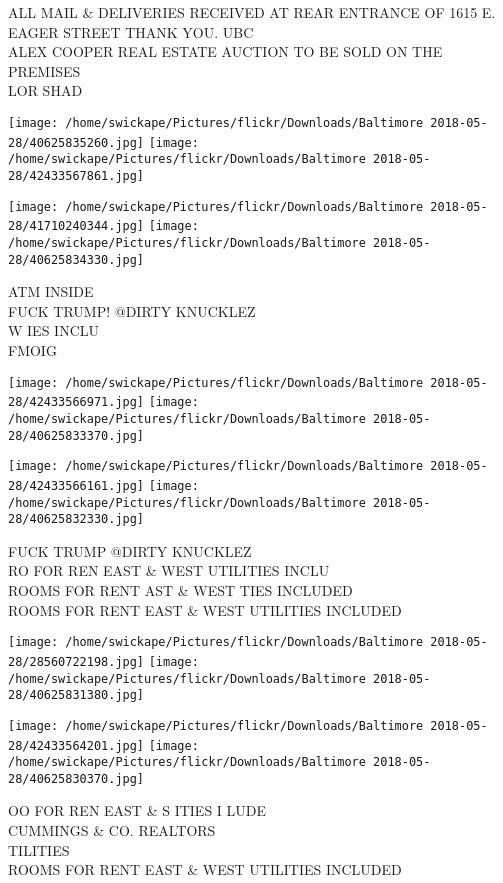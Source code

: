 \documentclass[10pt,letterpaper]{article}
\begin{document}
ALL MAIL \& DELIVERIES RECEIVED AT REAR ENTRANCE OF 1615 E. EAGER STREET THANK YOU. UBC\\
ALEX COOPER REAL ESTATE AUCTION TO BE SOLD ON THE PREMISES\\
LOR SHAD\\
\pagebreak

\texttt{[image: /home/swickape/Pictures/flickr/Downloads/Baltimore 2018-05-28/40625835260.jpg]}
\texttt{[image: /home/swickape/Pictures/flickr/Downloads/Baltimore 2018-05-28/42433567861.jpg]}

\texttt{[image: /home/swickape/Pictures/flickr/Downloads/Baltimore 2018-05-28/41710240344.jpg]}
\texttt{[image: /home/swickape/Pictures/flickr/Downloads/Baltimore 2018-05-28/40625834330.jpg]}

ATM INSIDE\\
FUCK TRUMP!  @DIRTY KNUCKLEZ\\
W IES INCLU\\
FMOIG\\
\pagebreak

\texttt{[image: /home/swickape/Pictures/flickr/Downloads/Baltimore 2018-05-28/42433566971.jpg]}
\texttt{[image: /home/swickape/Pictures/flickr/Downloads/Baltimore 2018-05-28/40625833370.jpg]}

\texttt{[image: /home/swickape/Pictures/flickr/Downloads/Baltimore 2018-05-28/42433566161.jpg]}
\texttt{[image: /home/swickape/Pictures/flickr/Downloads/Baltimore 2018-05-28/40625832330.jpg]}

FUCK TRUMP @DIRTY KNUCKLEZ\\
RO FOR REN EAST \& WEST UTILITIES INCLU\\
ROOMS FOR RENT AST \& WEST TIES INCLUDED\\
ROOMS FOR RENT EAST \& WEST UTILITIES INCLUDED\\
\pagebreak

\texttt{[image: /home/swickape/Pictures/flickr/Downloads/Baltimore 2018-05-28/28560722198.jpg]}
\texttt{[image: /home/swickape/Pictures/flickr/Downloads/Baltimore 2018-05-28/40625831380.jpg]}

\texttt{[image: /home/swickape/Pictures/flickr/Downloads/Baltimore 2018-05-28/42433564201.jpg]}
\texttt{[image: /home/swickape/Pictures/flickr/Downloads/Baltimore 2018-05-28/40625830370.jpg]}

OO FOR REN EAST \& S ITIES I LUDE\\
CUMMINGS \& CO. REALTORS\\
TILITIES\\
ROOMS FOR RENT EAST \& WEST UTILITIES INCLUDED\\
\pagebreak
\end{document}
